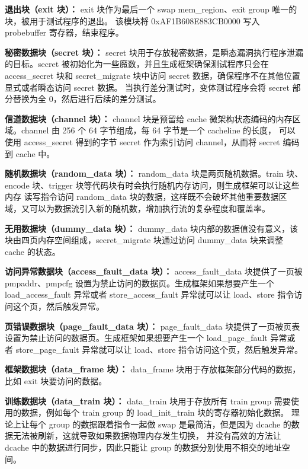 \textbf{退出块（exit 块）：}
exit 块作为最后一个 swap mem\_region、exit group 唯一的块，被用于测试程序的退出。
该模块将 0xAF1B608E883CB0000 写入 probebuffer 寄存器，结束程序。\par

\textbf{秘密数据块（secret 块）：}
secret 块用于存放秘密数据，是瞬态漏洞执行程序泄漏的目标。secret 被初始化为一些魔数，并且生成框架确保测试程序只会在
 access\_secret 块和 secret\_migrate 块中访问 secret 数据，确保程序不在其他位置显式或者瞬态访问 secret 数据。
当执行差分测试时，变体测试程序会将 secret 部分替换为全 0，然后进行后续的差分测试。\par

\textbf{信道数据块（channel 块）：}
channel 块是预留给 cache 微架构状态编码的内存区域。channel 由 256 个 64 字节组成，每 64 字节是一个 cacheline 的长度，
可以使用 access\_secret 得到的字节 secret 作为索引访问 channel，从而将 secret 编码到 cache 中。\par

\textbf{随机数据块（random\_data 块）：}
random\_data 块是两页随机数据。train 块、encode 块、trigger 块等代码块有时会执行随机内存访问，则生成框架可以让这些内存
读写指令访问 random\_data 块的数据，这样既不会破坏其他重要数据区域，又可以为数据流引入新的随机数，增加执行流的复杂程度和覆盖率。\par

\textbf{无用数据块（dummy\_data 块）：}
dummy\_data 块内部的数据值没有意义，该块由四页内存空间组成，secret\_migrate 块通过访问 dummy\_data 块来调整 cache 的状态。\par

\textbf{访问异常数据块（access\_fault\_data 块）：}
access\_fault\_data 块提供了一页被 pmpaddr、pmpcfg 设置为禁止访问的数据页。生成框架如果想要产生一个 load\_access\_fault 异常或者
store\_access\_fault 异常就可以让 load、store 指令访问这个页，然后触发异常。\par

\textbf{页错误数据块（page\_fault\_data 块）：}
page\_fault\_data 块提供了一页被页表设置为禁止访问的数据页。生成框架如果想要产生一个 load\_page\_fault 异常或者
store\_page\_fault 异常就可以让 load、store 指令访问这个页，然后触发异常。\par

\textbf{框架数据块（data\_frame 块）：}
data\_frame 块用于存放框架部分代码的数据，比如 exit 块要访问的数据。\par

\textbf{训练数据块（data\_train 块）：}
data\_train 块用于存放所有 train group 需要使用的数据，例如每个 train group 的 load\_init\_train 块的寄存器初始化数据。
理论上让每个 group 的数据跟着指令一起做 swap 是最简洁，但是因为 dcache 的数据无法被刷新，这就导致如果数据物理内存发生切换，
并没有高效的方法让 dcache 中的数据进行同步，因此只能让 group 的数据分别使用不相交的地址空间。\par

